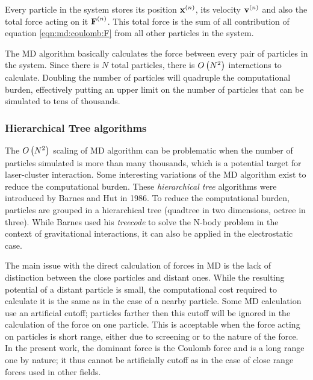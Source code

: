 Every particle in the system stores its position $\textbf{x}^{\left( n \right)}$, its velocity
$\textbf{v}^{\left( n \right)}$ and also the total force acting on it $\textbf{F}^{\left( n \right)}$. This total
force is the sum of all contribution of equation \eqref{eqn:md:coulomb:F} from
all other particles in the system.

The MD algorithm basically calculates the force between every pair of particles
in the system. Since there is $N$ total particles, there is $O\left( N^2 \right)$
interactions to calculate. Doubling the number of particles will quadruple the
computational burden, effectively putting an upper limit on the number of
particles that can be simulated to tens of thousands.

\subsubsection{Hierarchical Tree algorithms}
The $O\left( N^2 \right)$ scaling of MD algorithm can be problematic when the number of
particles simulated is more than many thousands, which is a potential target
for laser-cluster interaction. Some interesting variations of the MD algorithm
exist to reduce the computational burden. These \textit{hierarchical tree}
algorithms were introduced\cite{Barnes1986} by Barnes and Hut in 1986. To
reduce the computational burden, particles are grouped in a hierarchical tree
(quadtree in two dimensions, octree in three). While Barnes used his
\textit{treecode} to solve the N-body problem in the context of gravitational
interactions, it can also be applied in the electrostatic case.

The main issue with the direct calculation of forces in MD is the lack of
distinction between the close particles and distant ones. While the resulting
potential of a distant particle is small, the computational cost required to
calculate it is the same as in the case of a nearby particle. Some MD
calculation use an artificial cutoff; particles farther then this cutoff will
be ignored in the calculation of the force on one particle. This is acceptable
when the force acting on particles is short range, either due to screening or
to the nature of the force. In the present work, the dominant force is the
Coulomb force and is a long range one by nature; it thus cannot be artificially
cutoff as in the case of close range forces used in other fields.

